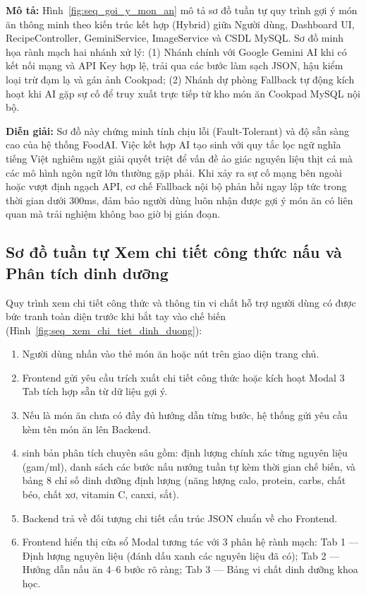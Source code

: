 \noindent\textbf{Mô tả:} Hình~\ref{fig:seq_goi_y_mon_an} mô tả sơ đồ tuần tự quy trình gợi ý món ăn thông minh theo kiến trúc kết hợp (Hybrid) giữa Người dùng, Dashboard UI, RecipeController, GeminiService, ImageService và CSDL MySQL. Sơ đồ minh họa rành mạch hai nhánh xử lý: (1) Nhánh chính với Google Gemini AI khi có kết nối mạng và API Key hợp lệ, trải qua các bước làm sạch JSON, hậu kiểm loại trừ đạm lạ và gán ảnh Cookpad; (2) Nhánh dự phòng Fallback tự động kích hoạt khi AI gặp sự cố để truy xuất trực tiếp từ kho món ăn Cookpad MySQL nội bộ.

\noindent\textbf{Diễn giải:} Sơ đồ này chứng minh tính chịu lỗi (Fault-Tolerant) và độ sẵn sàng cao của hệ thống FoodAI. Việc kết hợp AI tạo sinh với quy tắc lọc ngữ nghĩa tiếng Việt nghiêm ngặt giải quyết triệt để vấn đề ảo giác nguyên liệu thịt cá mà các mô hình ngôn ngữ lớn thường gặp phải. Khi xảy ra sự cố mạng bên ngoài hoặc vượt định ngạch API, cơ chế Fallback nội bộ phản hồi ngay lập tức trong thời gian dưới 300ms, đảm bảo người dùng luôn nhận được gợi ý món ăn có liên quan mà trải nghiệm không bao giờ bị gián đoạn.

\subsection{Sơ đồ tuần tự Xem chi tiết công thức nấu và Phân tích dinh dưỡng}

Quy trình xem chi tiết công thức và thông tin vi chất hỗ trợ người dùng có được bức tranh toàn diện trước khi bắt tay vào chế biến (Hình~\ref{fig:seq_xem_chi_tiet_dinh_duong}):
\begin{enumerate}[leftmargin=1.6em, itemsep=2pt]
  \item Người dùng nhấn vào thẻ món ăn hoặc nút  trên giao diện trang chủ.
  \item Frontend gửi yêu cầu trích xuất chi tiết công thức hoặc kích hoạt Modal 3 Tab tích hợp sẵn từ dữ liệu gợi ý.
  \item Nếu là món ăn chưa có đầy đủ hướng dẫn từng bước, hệ thống gửi yêu cầu  kèm tên món ăn lên Backend.
  \item {} sinh bản phân tích chuyên sâu gồm: định lượng chính xác từng nguyên liệu (gam/ml), danh sách các bước nấu nướng tuần tự kèm thời gian chế biến, và bảng 8 chỉ số dinh dưỡng định lượng (năng lượng calo, protein, carbs, chất béo, chất xơ, vitamin C, canxi, sắt).
  \item Backend trả về đối tượng chi tiết cấu trúc JSON chuẩn về cho Frontend.
  \item Frontend hiển thị cửa sổ Modal tương tác với 3 phân hệ rành mạch: Tab 1 --- Định lượng nguyên liệu (đánh dấu xanh các nguyên liệu đã có); Tab 2 --- Hướng dẫn nấu ăn 4--6 bước rõ ràng; Tab 3 --- Bảng vi chất dinh dưỡng khoa học.
\end{enumerate}

